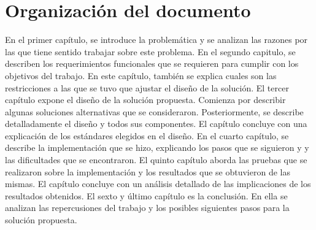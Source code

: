 \section{Organización del documento}
En el primer capítulo, se introduce la problemática y se analizan las razones por las que tiene sentido trabajar sobre este problema.
En el segundo capitulo, se describen los requerimientos funcionales que se requieren para cumplir con los objetivos del trabajo. En este capítulo, también se explica cuales son las restricciones a las que se tuvo que ajustar el diseño de la solución.
El tercer capítulo expone el diseño de la solución propuesta. Comienza por describir algunas soluciones alternativas que se consideraron. Posteriormente, se describe detalladamente el diseño y todos sus componentes. El capítulo concluye con una explicación de los estándares elegidos en el diseño.
En el cuarto capítulo, se describe la implementación que se hizo, explicando los pasos que se siguieron y y las dificultades que se encontraron.
El quinto capítulo aborda las pruebas que se realizaron sobre la implementación y los resultados que se obtuvieron de las mismas. El capítulo concluye con un análisis detallado de las implicaciones de los resultados obtenidos.
El sexto y último capítulo es la conclusión. En ella se analizan las repercusiones del trabajo y los posibles siguientes pasos para la solución propuesta.